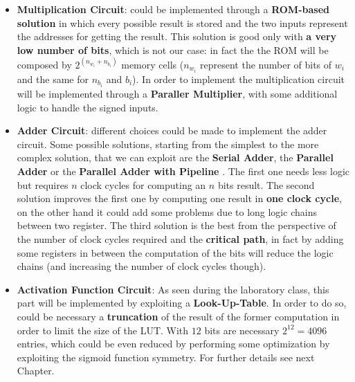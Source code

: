 \begin{itemize}
	\item{\textbf{Multiplication Circuit}}: could be implemented through a \textbf{ROM-based solution} in which every possible result is stored and the two inputs represent the addresses for getting the result. This solution is good only with \textbf{a very low number of bits}, which is not our case: in fact the the ROM will be composed by $2^{(n_{w_{i}} + n_{b_{i}})}$ memory cells ($n_{w_{i}}$ represent the number of bits of $w_{i}$ and the same for $n_{b_{i}}$ and $b_{i}$). In order to implement the multiplication circuit will be implemented through a  \textbf{Paraller Multiplier}, with some additional logic to handle the signed inputs.
	\item{\textbf{Adder Circuit}}: different choices could be made to implement the adder circuit. Some possible solutions, starting from the simplest to the more complex solution, that we can exploit are the \textbf{Serial Adder}, the \textbf{Parallel Adder} or the \textbf{Parallel Adder with Pipeline }. The first one needs less logic but requires $n$ clock cycles for computing an $n$ bits result. The second solution improves the first one by computing one result in \textbf{one clock cycle}, on the other hand it could add some problems due to long logic chains between two register. The third solution is the best from the perspective of the number of clock cycles required and the \textbf{critical path}, in fact by adding some registers in between the computation of the bits will reduce the logic chains (and increasing the number of clock cycles though). 
	\item{\textbf{Activation Function Circuit}}: As seen during the laboratory class, this part will be implemented by exploiting a \textbf{Look-Up-Table}. In order to do so, could be necessary a \textbf{truncation} of the result of the former computation in order to limit the size of the LUT. With $12$ bits are necessary $2^{12} = 4096$ entries, which could be even reduced by performing some optimization by exploiting the sigmoid function symmetry. For further details see next Chapter.
\end{itemize} 
